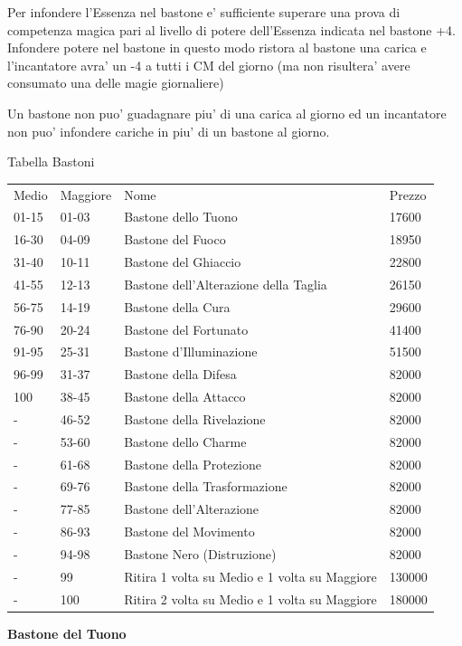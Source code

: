 \documentclass[a4paper,11pt,twoside,openany]{dndbook}
\begin{document}
{Per infondere l'Essenza nel bastone e' sufficiente superare una prova di competenza magica pari al livello di potere dell'Essenza indicata nel bastone +4. Infondere potere nel bastone in questo modo ristora al bastone una carica e l'incantatore avra' un -4 a tutti i CM del giorno (ma non risultera' avere consumato una delle magie giornaliere)

Un bastone non puo' guadagnare piu' di una carica al giorno ed un incantatore non puo' infondere cariche in piu' di un bastone al giorno.

\bigskip

Tabella Bastoni

\begin{tabular}[c]{@{}llll@{}}
\toprule 
Medio & Maggiore & Nome & Prezzo\tabularnewline
01-15 & 01-03 & Bastone dello Tuono \index{Bastone dello Tuono} & 17600\tabularnewline
16-30 & 04-09 & Bastone del Fuoco \index{Bastone del Fuoco} & 18950\tabularnewline
31-40 & 10-11 & Bastone del Ghiaccio \index{Bastone del Ghiaccio} & 22800\tabularnewline
41-55 & 12-13 & Bastone dell'Alterazione della Taglia \index{Bastone dell'Alterazione della Taglia}& 26150\tabularnewline
56-75 & 14-19 & Bastone della Cura \index{Bastone della Cura}& 29600\tabularnewline
76-90 & 20-24 & Bastone del Fortunato \index{Bastone del Fortunato} & 41400\tabularnewline
91-95 & 25-31 & Bastone d'Illuminazione \index{Bastone d'Illuminazione} & 51500\tabularnewline
96-99 & 31-37 & Bastone della Difesa \index{Bastone della Difesa} & 82000\tabularnewline
100 & 38-45 & Bastone della Attacco \index{Bastone della Attacco}& 82000\tabularnewline
- & 46-52 & Bastone della Rivelazione \index{Bastone della Rivelazione} & 82000\tabularnewline
- & 53-60 & Bastone dello Charme \index{Bastone dello Charme} & 82000\tabularnewline
- & 61-68 & Bastone della Protezione \index{Bastone della Protezione} & 82000\tabularnewline
- & 69-76 & Bastone della Trasformazione \index{Bastone della Trasformazione} & 82000\tabularnewline
- & 77-85 & Bastone dell'Alterazione \index{Bastone dell'Alterazione} & 82000\tabularnewline
- & 86-93 & Bastone del Movimento \index{Bastone del Movimento} & 82000\tabularnewline
- & 94-98 & Bastone Nero (Distruzione) \index{Bastone Nero (Distruzione)} & 82000\tabularnewline
- & 99 & Ritira 1 volta su Medio e 1 volta su Maggiore & 130000\tabularnewline
- & 100 & Ritira 2 volta su Medio e 1 volta su Maggiore & 180000\tabularnewline
\bottomrule
\end{tabular}

\textbf{Bastone del Tuono}

}
\end{document}
